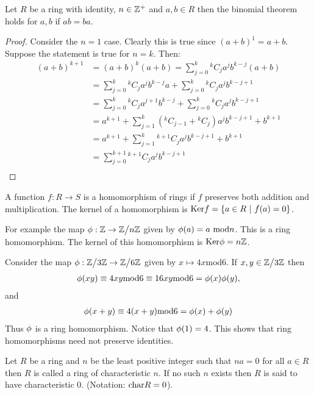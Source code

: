 \begin{theorem}
  Let $R$ be a ring with identity, $n\in \mathbb{Z}^+$ and $a,b\in R$ then the binomial theorem holds for $a,b$ if $ab=ba$.
\end{theorem}
\begin{proof}
   Consider the $n=1$ case. Clearly this is true since $(a+b)^1 = a+b$. Suppose the statement is true for $n=k$. Then:
   \begin{align*}
     (a+b)^{k+1} &= (a+b)^k (a+b) = \sum_{j=0}^k {}^kC_j a^j b^{k-j} (a+b)\\
              &= \sum_{j=0}^k {}^kC_j a^j b^{k-j} a + \sum_{j=0}^k {}^kC_j a^j b^{k-j+1}\\
              &= \sum_{j=0}^k {}^kC_j a^{j+1} b^{k-j} + \sum_{j=0}^k {}^kC_j a^j b^{k-j+1}\\
              &= a^{k+1} + \sum_{j=1}^k ({}^kC_{j-1} + {}^kC_{j}) a^{j} b^{k-j+1} + b^{k+1}\\
              &= a^{k+1} + \sum_{j=1}^{k} {}^{k+1}C_{j} a^{j} b^{k-j+1} + b^{k+1}\\
              &=\sum_{j=0}^{k+1} {}^{k+1}C_{j} a^{j} b^{k-j+1}\\
   \end{align*}
\end{proof}
\begin{definition}
  A function $f:R\to S$ is a homomorphism of rings if $f$ preserves both addition and multiplication. The kernel of a homomorphism is $\text{Ker}{f} = \{a\in R\ |\ f(a) = 0\}$.
\end{definition}
\begin{example}
  For example the map $\p:\Z\to \Z\bign/n\Z$ given by $\p(a) = a\ \text{mod}n$. This is a ring homomorphism. The kernel of this homomorphism is $\text{Ker}\phi = n\mathbb{Z}$.
\end{example}
\begin{example}
  Consider the map $\p:\Z\bign/3\Z \to \Z\bign/6\Z$ given by $x\mapsto 4x\text{mod}6$. If $x,y\in \Z\bign/3\Z$ then
  \begin{align*}
    \phi(xy) \equiv 4xy\text{mod}6 \equiv 16 xy \text{mod}6 = \phi(x)\phi(y),
  \end{align*}
  and
  \begin{align*}
    \phi(x+y) \equiv 4(x+y)\text{mod}6 = \phi(x) + \phi(y) 
  \end{align*}
  Thus $\phi$ is a ring homomorphism. Notice that $\phi(1) = 4$. This shows that ring homomorphisms need not preserve identities.
\end{example}
\begin{definition}
  Let $R$ be a ring and $n$ be the least positive integer such that $na = 0$ for all $a\in R$ then $R$ is called a ring of characteristic $n$. If no such $n$ exists then $R$ is said to have characteristic $0$. (Notation: $\text{char} R = 0$).
\end{definition}

